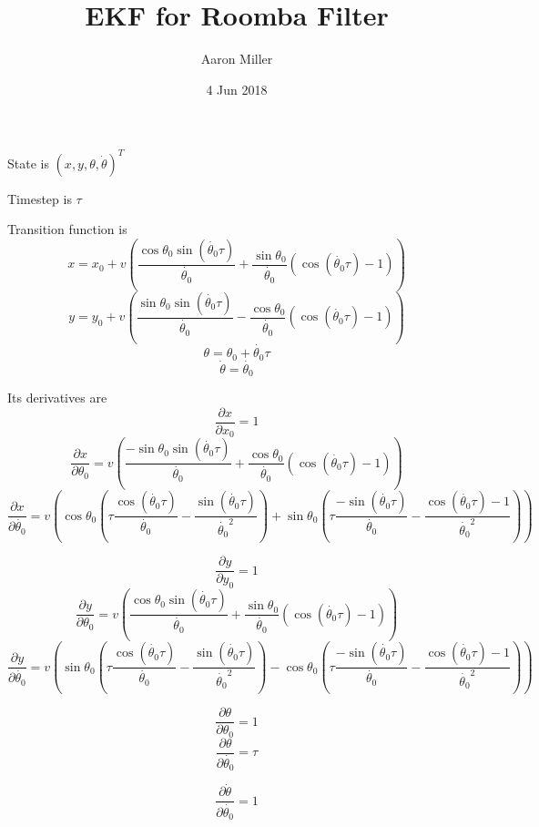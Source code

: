 \documentclass[12pt]{article}
\begin{document}
 
\title{EKF for Roomba Filter}
\author{Aaron Miller}
\date{4 Jun 2018}
\maketitle

State is $(x, y, \theta, \dot{\theta})^T$

Timestep is $\tau$

Transition function is
$$x = x_0 + v \left(\frac{\cos \theta_0 \sin (\dot{\theta_0} \tau)}{\dot{\theta_0}}
              + \frac{\sin \theta_0}{\dot{\theta_0}}(\cos (\dot{\theta_0} \tau) - 1) \right)$$
$$y = y_0 + v \left(\frac{\sin \theta_0 \sin (\dot{\theta_0} \tau)}{\dot{\theta_0}}
              - \frac{\cos \theta_0}{\dot{\theta_0}}(\cos (\dot{\theta_0} \tau) - 1) \right)$$
$$\theta = \theta_0 + \dot{\theta_0} \tau$$
$$\dot{\theta} = \dot{\theta_0}$$

Its derivatives are
$$\frac{\partial x}{\partial x_0} = 1$$
$$\frac{\partial x}{\partial \theta_0} = v \left(\frac{-\sin \theta_0 \sin (\dot{\theta_0} \tau)}{\dot{\theta_0}}
              + \frac{\cos \theta_0}{\dot{\theta_0}}(\cos (\dot{\theta_0} \tau) - 1) \right)$$
$$\frac{\partial x}{\partial \dot{\theta_0}} = v \left( \cos \theta_0 \left( \tau \frac{\cos (\dot{\theta_0} \tau)}{\dot{\theta_0}} - \frac{\sin (\dot{\theta_0} \tau)}{\dot{\theta_0}^2} \right) + \sin \theta_0 \left( \tau \frac{-\sin (\dot{\theta_0} \tau)}{\dot{\theta_0}} - \frac{\cos (\dot{\theta_0} \tau) - 1}{\dot{\theta_0}^2} \right) \right)$$

$$\frac{\partial y}{\partial y_0} = 1$$
$$\frac{\partial y}{\partial \theta_0} = v \left(\frac{\cos \theta_0 \sin (\dot{\theta_0} \tau)}{\dot{\theta_0}}
              + \frac{\sin \theta_0}{\dot{\theta_0}}(\cos (\dot{\theta_0} \tau) - 1) \right)$$
$$\frac{\partial y}{\partial \dot{\theta_0}} = v \left( \sin \theta_0 \left( \tau \frac{\cos (\dot{\theta_0} \tau)}{\dot{\theta_0}} - \frac{\sin (\dot{\theta_0} \tau)}{\dot{\theta_0}^2} \right) - \cos \theta_0 \left( \tau \frac{-\sin (\dot{\theta_0} \tau)}{\dot{\theta_0}} - \frac{\cos (\dot{\theta_0} \tau) - 1}{\dot{\theta_0}^2} \right) \right)$$

$$\frac{\partial \theta}{\partial \theta_0} = 1$$
$$\frac{\partial \theta}{\partial \dot{\theta_0}} = \tau$$

$$\frac{\partial \dot{\theta}}{\partial \dot{\theta_0}} = 1$$
\end{document}
